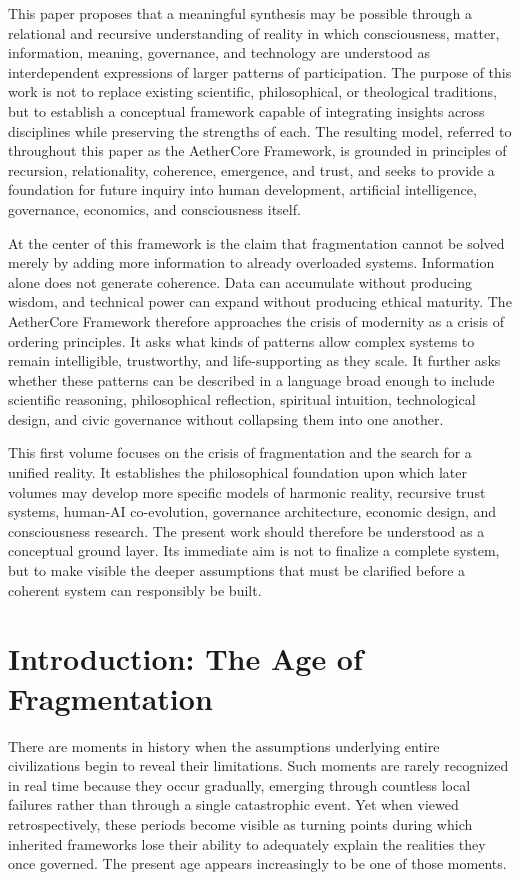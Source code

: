 \documentclass[12pt]{article}
\begin{document}
This paper proposes that a meaningful synthesis may be possible through a relational and recursive understanding of reality in which consciousness, matter, information, meaning, governance, and technology are understood as interdependent expressions of larger patterns of participation. The purpose of this work is not to replace existing scientific, philosophical, or theological traditions, but to establish a conceptual framework capable of integrating insights across disciplines while preserving the strengths of each. The resulting model, referred to throughout this paper as the AetherCore Framework, is grounded in principles of recursion, relationality, coherence, emergence, and trust, and seeks to provide a foundation for future inquiry into human development, artificial intelligence, governance, economics, and consciousness itself.

At the center of this framework is the claim that fragmentation cannot be solved merely by adding more information to already overloaded systems. Information alone does not generate coherence. Data can accumulate without producing wisdom, and technical power can expand without producing ethical maturity. The AetherCore Framework therefore approaches the crisis of modernity as a crisis of ordering principles. It asks what kinds of patterns allow complex systems to remain intelligible, trustworthy, and life-supporting as they scale. It further asks whether these patterns can be described in a language broad enough to include scientific reasoning, philosophical reflection, spiritual intuition, technological design, and civic governance without collapsing them into one another.

This first volume focuses on the crisis of fragmentation and the search for a unified reality. It establishes the philosophical foundation upon which later volumes may develop more specific models of harmonic reality, recursive trust systems, human-AI co-evolution, governance architecture, economic design, and consciousness research. The present work should therefore be understood as a conceptual ground layer. Its immediate aim is not to finalize a complete system, but to make visible the deeper assumptions that must be clarified before a coherent system can responsibly be built.

\section{Introduction: The Age of Fragmentation}

There are moments in history when the assumptions underlying entire civilizations begin to reveal their limitations. Such moments are rarely recognized in real time because they occur gradually, emerging through countless local failures rather than through a single catastrophic event. Yet when viewed retrospectively, these periods become visible as turning points during which inherited frameworks lose their ability to adequately explain the realities they once governed. The present age appears increasingly to be one of those moments.
\end{document}
